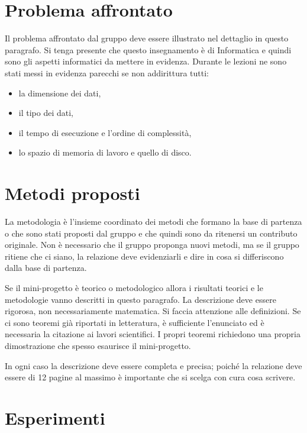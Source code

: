 \documentclass[runningheads]{llncs}
\begin{document}
\section{Problema affrontato}
\label{sec:problema-affrontato}

Il problema affrontato dal gruppo deve essere illustrato nel dettaglio
in questo paragrafo.  Si tenga presente che questo insegnamento \`e di
Informatica e quindi sono gli aspetti informatici da mettere in
evidenza.  Durante le lezioni ne sono stati messi in evidenza parecchi
se non addirittura tutti:
\begin{itemize}
\item la dimensione dei dati,
\item il tipo dei dati,
\item il tempo di esecuzione e l'ordine di complessit\`a,
\item lo spazio di memoria di lavoro e quello di disco.
\end{itemize}

\section{Metodi proposti}
\label{sec:metodi-utilizzati}

La metodologia \`e l'insieme coordinato dei metodi che formano la base
di partenza o che sono stati proposti dal gruppo e che quindi sono da
ritenersi un contributo originale.  Non \`e necessario che il gruppo
proponga nuovi metodi, ma se il gruppo ritiene che ci siano, la
relazione deve evidenziarli e dire in cosa si differiscono dalla base
di partenza.

Se il mini-progetto \`e teorico o metodologico allora i risultati
teorici e le metodologie vanno descritti in questo paragrafo.  La
descrizione deve essere rigorosa, non necessariamente matematica.  Si
faccia attenzione alle definizioni.  Se ci sono teoremi gi\`a
riportati in letteratura, \`e sufficiente l'enunciato ed \`e
necessaria la citazione ai lavori scientifici.  I propri teoremi
richiedono una propria dimostrazione che spesso esaurisce il
mini-progetto. 

In ogni caso la descrizione deve essere completa e precisa; poich\'e
la relazione deve essere di 12 pagine al massimo \`e importante che si
scelga con cura cosa scrivere.

\section{Esperimenti}
\label{sec:esperimenti}
\end{document}
